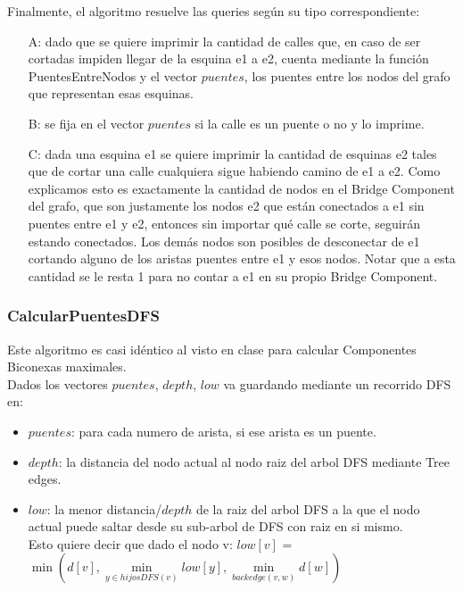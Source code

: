 Finalmente, el algoritmo resuelve las queries según su tipo correspondiente:
\begin{itemize}
	\item[A: ] dado que se quiere imprimir la cantidad de calles que, en caso de ser cortadas impiden llegar de la 
	esquina e1 a e2, cuenta mediante la función PuentesEntreNodos y el vector $puentes$, los puentes entre los nodos 
	del grafo que representan esas esquinas.
	\item[B: ] se fija en el vector $puentes$ si la calle es un puente o no y lo imprime.
	\item[C: ] dada una esquina e1 se quiere imprimir la cantidad de esquinas e2 tales que de cortar una calle cualquiera 
	sigue habiendo camino de e1 a e2. Como explicamos esto es exactamente la cantidad de nodos en el Bridge Component del
	grafo, que son justamente los nodos e2 que están conectados a e1 sin puentes entre e1 y e2, entonces sin importar
	qué calle se corte, seguirán estando conectados. Los demás nodos son posibles de desconectar de e1 cortando alguno
	de los aristas puentes entre e1 y esos nodos. Notar que a esta cantidad se le resta 1 para no contar a e1 en su 
	propio Bridge Component.
\end{itemize}

\subsubsection*{CalcularPuentesDFS}

Este algoritmo es casi idéntico al visto en clase para calcular Componentes Biconexas maximales. \\

Dados los vectores $puentes$, $depth$, $low$ va guardando mediante un recorrido DFS en:
\begin{itemize}
	\item $puentes$: para cada numero de arista, si ese arista es un puente.
	\item $depth$: la distancia del nodo actual al nodo raiz del arbol DFS mediante Tree edges.
	\item $low$: la menor distancia/$depth$ de la raiz del arbol DFS a la que el nodo actual puede saltar
	desde su sub-arbol de DFS con raiz en si mismo. \\
	Esto quiere decir que dado el nodo v: $low[v]$ = $\min(d[v], \min\limits_{y \in hijosDFS(v)} low[y], \min\limits_{backedge(v,w)} d[w])$
\end{itemize}

